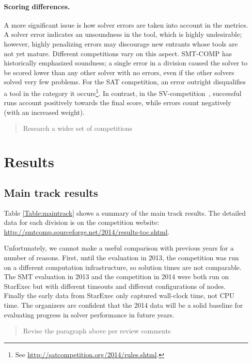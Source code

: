 \documentclass[twoside,11pt]{article}
\newcommand{\comment}[2]{\begin{quote}\sc #1\marginpar{\textcolor{red}{$\ast^{\mbox{#2}}$}}\end{quote}}
\newcommand{\davidc}[1]{\comment{#1}{DC}}
\begin{document}
\paragraph{Scoring differences.} A more significant issue is how solver errors are taken into account in the metrics. A solver error indicates an unsoundness in the tool, which is highly undesirable; however, highly penalizing errors may discourage new entrants whose tools are not yet mature. Different competitions vary on this aspect. SMT-COMP has historically emphasized soundness; a
single error in a division caused the solver to be scored lower than any other solver with no errors, even if the other solvers solved very few problems. For the SAT competition, an error outright disqualifies a tool in the category it occurs\footnote{See \url{http://satcompetition.org/2014/rules.shtml}.}. In contrast, in the SV-competition~\cite{svcomp-2015}, successful runs account positively towards the final score, while errors count negatively (with an increased weight). 

\davidc{Research a wider set of competitions}

\section{Results}
\label{sec:results}

\subsection{Main track results}
\label{sec:timeouts}

Table \ref{Table:maintrack} shows a summary of the main track results. The detailed data for each division is on the competition website: \url{http://smtcomp.sourceforge.net/2014/results-toc.shtml}.

Unfortunately, we cannot make a useful comparison with previous years for a number of reasons. First, until the evaluation in 2013, the competition was run on a different computation infrastructure, so solution times are not comparable. The SMT evaluation in 2013 and the competition in 2014 were both run on StarExec but with different timeouts and different configurations of nodes. Finally the early data from StarExec only captured wall-clock time, not CPU time. The organizers are confident that the 2014 data will be a solid baseline for evaluating progress in solver performance in future years.

\davidc{Revise the paragraph above per review comments}
\end{document}
